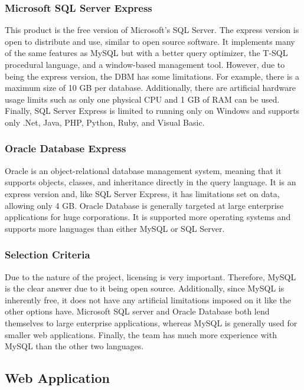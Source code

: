\documentclass[10pt, onecolumn, twoside, peerreview]{IEEEtran}
\begin{document}
\subsubsection{Microsoft SQL Server Express}
This product is the free version of Microsoft’s SQL Server. The express version is open to distribute and use, similar
to open source software. It implements many of the same features as MySQL but with a better query optimizer, the T-SQL
procedural language, and a window-based management tool. However, due to being the express version, the DBM has some
limitations. For example, there is a maximum size of 10 GB per database. Additionally, there are artificial hardware
usage limits such as only one physical CPU and 1 GB of RAM can be used. Finally, SQL Server Express is limited to
running only on Windows and supports only .Net, Java, PHP, Python, Ruby, and Visual Basic.\\

\subsubsection{Oracle Database Express}
Oracle is an object-relational database management system, meaning that it supports objects, classes, and inheritance
directly in the query language. It is an express version and, like SQL Server Express, it has limitations set on data,
allowing only 4 GB. Oracle Database is generally targeted at large enterprise applications for huge corporations. It is
supported more operating systems and supports more languages than either MySQL or SQL Server.\\

\subsubsection{Selection Criteria}
Due to the nature of the project, licensing is very important. Therefore, MySQL is the clear answer due to it being
open source. Additionally, since MySQL is inherently free, it does not have any artificial limitations imposed on it
like the other options have. Microsoft SQL server and Oracle Database both lend themselves to large enterprise
applications, whereas MySQL is generally used for smaller web applications. Finally, the team has much more experience
with MySQL than the other two languages.

\subsection{Web Application}
\end{document}
